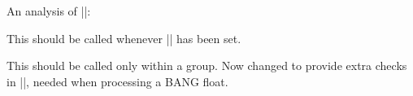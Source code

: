     \begin{teX}  
\def \@largefloatcheck{%
  \ifdim \ht\@currbox>\textheight
    \@tempdima -\textheight
    \advance \@tempdima \ht\@currbox
    \end{teX}

    \begin{teX}
    \@latex@warning {Float too large for page by \the\@tempdima}%
    \ht\@currbox \textheight
  \fi
}
    \end{teX}
 

  \begin{macro}{\@dbflt}
  \begin{macro}{\@xdblfloat}
    \begin{teX}
\def\@dbflt#1{\@ifnextchar[{\@xdblfloat{#1}}{\@xdblfloat{#1}[tp]}}
\def\@xdblfloat#1[#2]{%
  \@xfloat{#1}[#2]\hsize\textwidth\linewidth\textwidth}
    \end{teX}
  \end{macro}
  \end{macro}

    \begin{teX}
\newcount\c@topnumber
\newcount\c@dbltopnumber
\newcount\c@bottomnumber
\newcount\c@totalnumber
    \end{teX}


 An analysis of |\@floatplacement|:

 This should be called whenever |\@colht| has been set.
    \begin{teX}
\def\@floatplacement{\global\@topnum\c@topnumber
   \global\@toproom \topfraction\@colht
   \global\@botnum  \c@bottomnumber
   \global\@botroom \bottomfraction\@colht
   \global\@colnum  \c@totalnumber
   \@fpmin   \floatpagefraction\@colht}
    \end{teX}

  \begin{macro}{\@dblfloatplacement}
 
     This should be called only within a group.  Now changed to
     provide extra checks in |\@addtodblcol|, needed when processing a
     BANG float.
    
    \begin{teX}  
\def \@dblfloatplacement {%
    \end{teX}
    Textpage bit: global, but need not be.
    \begin{teX}  
  \global \@dbltopnum \c@dbltopnumber
  \global \@dbltoproom \dbltopfraction\@colht
    \end{teX}
   This new bit uses |\@textmin| to locally store the amount of extra
   room in the column.   
    \begin{teX}
  \@textmin \@colht
  \advance \@textmin -\@dbltoproom
    \end{teX}
    Floatpage bit: must be local.
    \begin{teX}
  \@fpmin \dblfloatpagefraction\textheight
  \@fptop \@dblfptop
  \@fpsep \@dblfpsep
  \@fpbot \@dblfpbot
}
    \end{teX}
  \end{macro}


